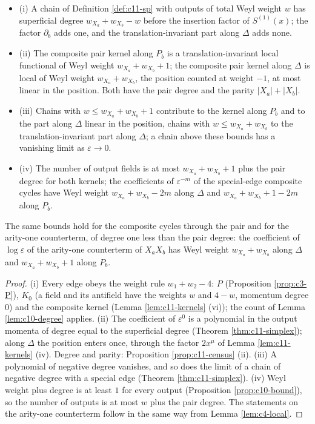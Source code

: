 \begin{proposition}
\label{prop:c11-bound}
\begin{itemize}
\item (i) A chain of Definition \ref{def:c11-sp} with outputs of total Weyl weight $w$ has superficial degree $w_{X_a}+w_{X_b}-w$ before the insertion factor of $S^{(1)}(x)$; the factor $\partial_b$ adds one, and the translation-invariant part along $\Delta$ adds none.
\item (ii) The composite pair kernel along $P_b$ is a translation-invariant local functional of Weyl weight $w_{X_a}+w_{X_b}+1$; the composite pair kernel along $\Delta$ is local of Weyl weight $w_{X_a}+w_{X_b}$, the position counted at weight $-1$, at most linear in the position. Both have the pair degree and the parity $|X_a|+|X_b|$.
\item (iii) Chains with $w\le w_{X_a}+w_{X_b}+1$ contribute to the kernel along $P_b$ and to the part along $\Delta$ linear in the position, chains with $w\le w_{X_a}+w_{X_b}$ to the translation-invariant part along $\Delta$; a chain above these bounds has a vanishing limit as $\varepsilon\to0$.
\item (iv) The number of output fields is at most $w_{X_a}+w_{X_b}+1$ plus the pair degree for both kernels; the coefficients of $\varepsilon^{-m}$ of the special-edge composite cycles have Weyl weight $w_{X_a}+w_{X_b}-2m$ along $\Delta$ and $w_{X_a}+w_{X_b}+1-2m$ along $P_b$.
\end{itemize}
The same bounds hold for the composite cycles through the pair and for the arity-one counterterm, of degree one less than the pair degree: the coefficient of $\log\varepsilon$ of the arity-one counterterm of $X_aX_b$ has Weyl weight $w_{X_a}+w_{X_b}$ along $\Delta$ and $w_{X_a}+w_{X_b}+1$ along $P_b$.
\end{proposition}

\begin{proof}
(i) Every edge obeys the weight rule $w_1+w_2-4$: $P$ (Proposition \ref{prop:c3-P}), $K_0$ (a field and its antifield have the weights $w$ and $4-w$, momentum degree $0$) and the composite kernel (Lemma \ref{lem:c11-kernels} (vi)); the count of Lemma \ref{lem:c10-degree} applies. (ii) The coefficient of $\varepsilon^0$ is a polynomial in the output momenta of degree equal to the superficial degree (Theorem \ref{thm:c11-simplex}); along $\Delta$ the position enters once, through the factor $2x^\mu$ of Lemma \ref{lem:c11-kernels} (iv). Degree and parity: Proposition \ref{prop:c11-census} (ii). (iii) A polynomial of negative degree vanishes, and so does the limit of a chain of negative degree with a special edge (Theorem \ref{thm:c11-simplex}). (iv) Weyl weight plus degree is at least $1$ for every output (Proposition \ref{prop:c10-bound}), so the number of outputs is at most $w$ plus the pair degree. The statements on the arity-one counterterm follow in the same way from Lemma \ref{lem:c4-local}.
\end{proof}


